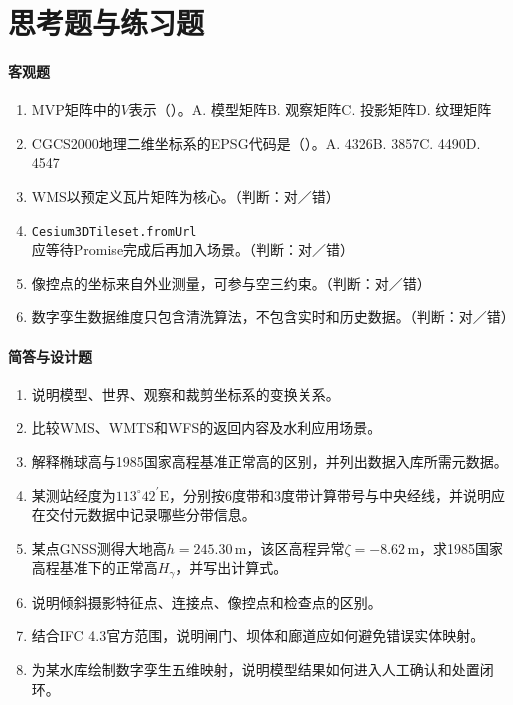 \section*{思考题与练习题}

\paragraph{客观题}
\begin{enumerate}
\item MVP矩阵中的$V$表示（\quad）。A. 模型矩阵\quad B. 观察矩阵\quad C. 投影矩阵\quad D. 纹理矩阵
\item CGCS2000地理二维坐标系的EPSG代码是（\quad）。A. 4326\quad B. 3857\quad C. 4490\quad D. 4547
\item WMS以预定义瓦片矩阵为核心。（判断：对／错）
\item \texttt{Cesium3DTileset.fromUrl}应等待Promise完成后再加入场景。（判断：对／错）
\item 像控点的坐标来自外业测量，可参与空三约束。（判断：对／错）
\item 数字孪生数据维度只包含清洗算法，不包含实时和历史数据。（判断：对／错）

\end{enumerate}

\paragraph{简答与设计题}
\begin{enumerate}[resume]
\item 说明模型、世界、观察和裁剪坐标系的变换关系。
\item 比较WMS、WMTS和WFS的返回内容及水利应用场景。
\item 解释椭球高与1985国家高程基准正常高的区别，并列出数据入库所需元数据。
\item 某测站经度为$113^\circ42^\prime\mathrm{E}$，分别按6度带和3度带计算带号与中央经线，并说明应在交付元数据中记录哪些分带信息。
\item 某点GNSS测得大地高$h=245.30\,\mathrm{m}$，该区高程异常$\zeta=-8.62\,\mathrm{m}$，求1985国家高程基准下的正常高$H_\gamma$，并写出计算式。
\item 说明倾斜摄影特征点、连接点、像控点和检查点的区别。
\item 结合IFC 4.3官方范围，说明闸门、坝体和廊道应如何避免错误实体映射。
\item 为某水库绘制数字孪生五维映射，说明模型结果如何进入人工确认和处置闭环。

\end{enumerate}

